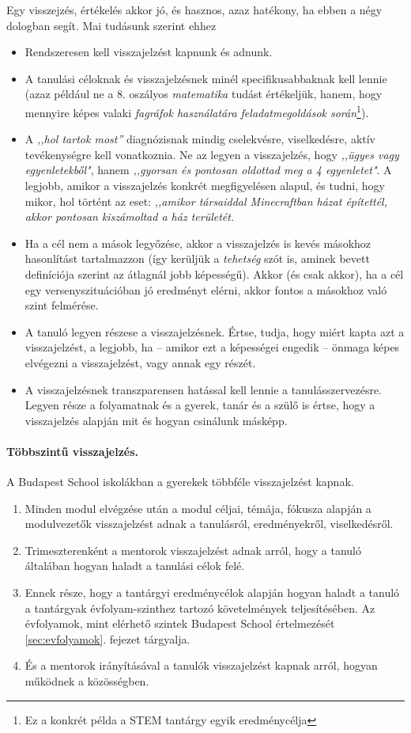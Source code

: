 Egy visszejzés, értékelés akkor jó, és hasznos, azaz hatékony, ha ebben a négy dologban segít. Mai tudásunk szerint ehhez
\begin{itemize}
\item Rendszeresen kell visszajelzést kapnunk és adnunk.
\item A tanulási céloknak és visszajelzésnek minél specifikusabbaknak kell lennie (azaz például ne a 8. oszályos \emph{matematika} tudást értékeljük, hanem, hogy mennyire képes valaki \emph{fagráfok használatára feladatmegoldások során}\footnote{Ez a konkrét példa a STEM tantárgy egyik eredménycélja}).
\item A \emph{,,hol tartok most''} diagnózisnak mindig cselekvésre, viselkedésre, aktív tevékenységre kell vonatkoznia. Ne az legyen a visszajelzés, hogy \emph{,,ügyes vagy egyenletekből"}, hanem \emph{,,gyorsan és pontosan oldottad meg a 4 egyenletet"}. A legjobb, amikor a visszajelzés konkrét megfigyelésen alapul, és tudni, hogy mikor, hol történt az eset: \emph{,,amikor társaiddal Minecraftban házat építettél, akkor pontosan kiszámoltad a ház területét.}
\item Ha a cél nem a mások legyőzése, akkor a visszajelzés is kevés másokhoz hasonlítást tartalmazzon (így kerüljük a \emph{tehetség} szót is, aminek bevett definíciója szerint az átlagnál jobb képességű). Akkor (és csak akkor), ha a cél egy versenyszituációban jó eredményt elérni, akkor fontos a másokhoz való szint felmérése.
\item A tanuló legyen részese a visszajelzésnek. Értse, tudja, hogy miért kapta azt a visszajelzést, a legjobb, ha -- amikor ezt a képességei engedik -- önmaga képes elvégezni a visszajelzést, vagy annak egy részét.
\item A visszajelzésnek transzparensen hatással kell lennie a tanulásszervezésre. Legyen része a folyamatnak és a gyerek, tanár és a szülő is értse, hogy a visszajelzés alapján mit és hogyan csinálunk másképp.
\end{itemize}

\paragraph{Többszintű visszajelzés.} A Budapest School iskolákban a gyerekek többféle visszajelzést kapnak. \begin{enumerate}
\item Minden modul elvégzése után a modul céljai, témája, fókusza alapján a modulvezetők visszajelzést adnak a tanulásról, eredményekről, viselkedésről.
\item Trimeszterenként a mentorok visszajelzést adnak arról, hogy a tanuló általában hogyan haladt a tanulási célok felé.
\item Ennek része, hogy a tantárgyi eredménycélok alapján hogyan haladt a tanuló a tantárgyak évfolyam-szinthez tartozó követelmények teljesítésében. Az évfolyamok, mint elérhető szintek Budapest School értelmezését \ref{sec:evfolyamok}. fejezet tárgyalja.
\item És a mentorok irányításával a tanulók visszajelzést kapnak arról, hogyan működnek a közösségben.
\end{enumerate}


